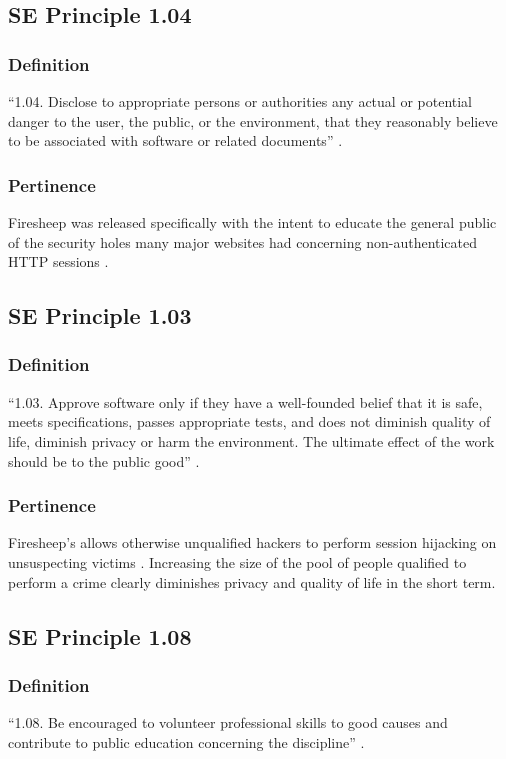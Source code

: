 \documentclass[12pt]{article}
\begin{document}
\subsection{SE Principle 1.04}
\subsubsection{Definition}
``1.04. Disclose to appropriate persons or authorities any actual or potential danger to the user, the public, or the environment, that they reasonably believe to be associated with software or related documents'' \cite{se-code}.
\subsubsection{Pertinence}
Firesheep was released specifically with the intent to educate the general public of the security holes many major websites had concerning non-authenticated HTTP sessions \cite{eric-butler}.

\subsection{SE Principle 1.03}
\subsubsection{Definition}
``1.03. Approve software only if they have a well-founded belief that it is safe, meets specifications, passes appropriate tests, and does not diminish quality of life, diminish privacy or harm the environment. The ultimate effect of the work should be to the public good'' \cite{se-code}.
\subsubsection{Pertinence}
Firesheep's allows otherwise unqualified hackers to perform session hijacking on unsuspecting victims \cite{eric-butler}. Increasing the size of the pool of people qualified to perform a crime clearly diminishes privacy and quality of life in the short term.

\subsection{SE Principle 1.08}
\subsubsection{Definition}
``1.08. Be encouraged to volunteer professional skills to good causes and contribute to public education concerning the discipline'' \cite{se-code}.
\end{document}

